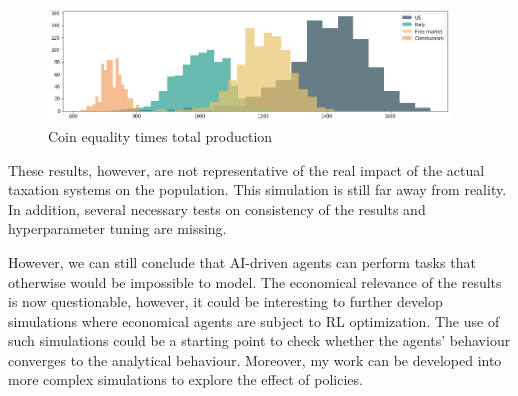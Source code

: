 \begin{figure}[h!]
    \centering
    \includegraphics[width=0.95\textwidth]{Resources/imgs/coin_times_eq.png}
    \caption[Coin equality times total production]%
    {\label{img:eqxprod_hist}Coin equality times total production\small \textit{}}
\end{figure}



These results, however, are not representative of the real impact of the actual taxation systems on the population. This simulation is still far away from reality. In addition, several necessary tests on consistency of the results and hyperparameter tuning are missing. 

However, we can still conclude that AI-driven agents can perform tasks that otherwise would be impossible to model. The economical relevance of the results is now questionable, however, it could be interesting to further develop simulations where economical agents are subject to RL optimization. The use of such simulations could be a starting point to check whether the agents' behaviour converges to the analytical behaviour. Moreover, my work can be developed into more complex simulations to explore the effect of policies.